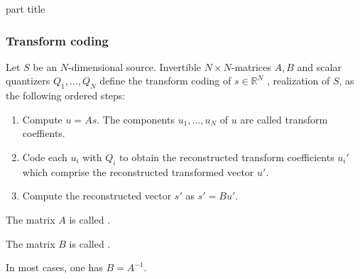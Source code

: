 \begin{frame}
 \vspace{12.0ex}
\begin{center}
\begin{beamercolorbox}[sep=12pt,center]{part title}
\insertsection\par
\end{beamercolorbox}
\end{center}
\end{frame}

\begin{frame}\frametitle{Transform coding}

\begin{definition}
Let $S$ be an $N$-dimensional source. Invertible $N\times N$-matrices $A, B$ and scalar quantizers $Q_1,\dots,Q_N$ 
define the transform coding of $s\in\mathbb{R}^N$ , realization of $S$, as the following ordered steps:
\begin{enumerate}
\item Compute $u=As$. The components $u_1,\dots,u_N$ of $u$ are called transform coeffients. 
\item Code each $u_i$ with $Q_i$ to obtain the reconstructed transform coefficients $u_i'$ which comprise the reconstructed transformed vector $u'$. 
\item Compute the reconstructed vector $s'$ as $s'=Bu'$.   
\end{enumerate}
\end{definition}
\bit
\item The matrix $A$ is called .
\item The matrix $B$ is called . 
\item In most cases, one has $B=A^{-1}$. 
\eit
\end{frame}




